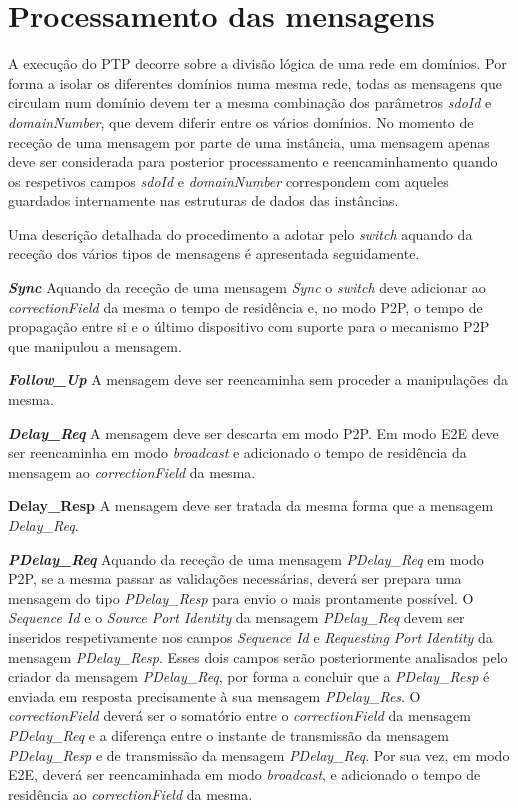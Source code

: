 \section{Processamento das mensagens}
A execução do PTP decorre sobre a divisão lógica de uma rede em domínios. Por forma a isolar os diferentes domínios numa mesma rede, todas as mensagens que circulam num domínio devem ter a mesma combinação dos parâmetros \textit{sdoId} e \textit{domainNumber}, que devem diferir entre os vários domínios. No momento de receção de uma mensagem por parte de uma instância, uma mensagem apenas deve ser considerada para posterior processamento e reencaminhamento quando os respetivos campos \textit{sdoId} e \textit{domainNumber} correspondem com aqueles guardados internamente nas estruturas de dados das instâncias. \par
Uma descrição detalhada do procedimento a adotar pelo \textit{switch} aquando da receção dos vários tipos de mensagens é apresentada seguidamente.

\textbf{\textit{Sync}} Aquando da receção de uma mensagem \textit{Sync} o \textit{switch} deve adicionar ao \textit{correctionField} da mesma o tempo de residência e, no modo P2P, o tempo de propagação entre si e o último dispositivo com suporte para o mecanismo P2P que manipulou a mensagem. \par

\textbf{\textit{Follow\_Up}} A mensagem deve ser reencaminha sem proceder a manipulações da mesma. \par

\textbf{\textit{Delay\_Req}} A mensagem deve ser descarta em modo P2P. Em modo E2E deve ser reencaminha em modo \textit{broadcast} e adicionado o tempo de residência da mensagem ao \textit{correctionField} da mesma. \par

\textbf{Delay\_Resp} A mensagem deve ser tratada da mesma forma que a mensagem \textit{Delay\_Req}. \par

\textbf{\textit{PDelay\_Req}} Aquando da receção de uma mensagem \textit{PDelay\_Req} em modo P2P, se a mesma passar as validações necessárias, deverá ser prepara uma mensagem do tipo \textit{PDelay\_Resp} para envio o mais prontamente possível. O \textit{Sequence Id} e o \textit{Source Port Identity} da mensagem \textit{PDelay\_Req} devem ser inseridos respetivamente nos campos \textit{Sequence Id} e \textit{Requesting Port Identity} da mensagem \textit{PDelay\_Resp}. Esses dois campos serão posteriormente analisados pelo criador da mensagem \textit{PDelay\_Req}, por forma a concluir que a \textit{PDelay\_Resp} é enviada em resposta precisamente à sua mensagem \textit{PDelay\_Res}. O \textit{correctionField} deverá ser o somatório entre o \textit{correctionField} da mensagem \textit{PDelay\_Req} e a diferença entre o instante de transmissão da mensagem \textit{PDelay\_Resp} e de transmissão da mensagem \textit{PDelay\_Req}. Por sua vez, em modo E2E, deverá ser reencaminhada em modo \textit{broadcast}, e adicionado o tempo de residência ao \textit{correctionField} da mesma.

